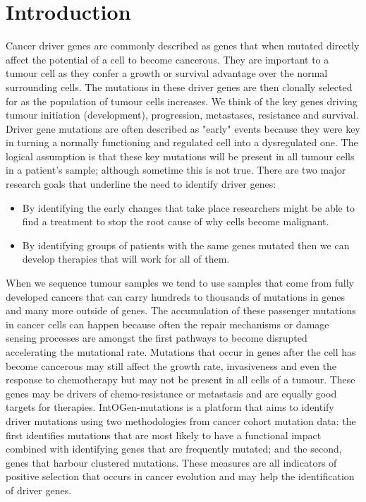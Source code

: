 \section{Introduction}
Cancer driver genes are commonly described as genes that when mutated directly affect
the potential of a cell to become cancerous. They are important to a tumour cell as they
confer a growth or survival advantage over the normal surrounding cells. The mutations
in these driver genes are then clonally selected for as the population of tumour cells
increases. We think of the key genes driving tumour initiation (development), progression,
metastases, resistance and survival. Driver gene mutations are often described as "early"
events because they were key in turning a normally functioning and regulated cell into a
dysregulated one. The logical assumption is that these key mutations will be present in
all tumour cells in a patient's sample; although sometime this is not true.
\vspace{4 mm}
There are two major research goals that underline the need to identify driver genes:
\begin{itemize}
\item By identifying the early changes that take place researchers might be able
to find a treatment to stop the root cause of why cells become malignant. 
\item By identifying groups of patients with the same genes mutated then we can
develop therapies that will work for all of them.
\end{itemize}
\vspace{4 mm}
When we sequence tumour samples we tend to use samples that come from fully developed
cancers that can carry hundreds to thousands of mutations in genes and many more outside
of genes. The accumulation of these passenger mutations in cancer cells can happen
because often the repair mechanisms or damage sensing processes are amongst the first
pathways to become disrupted accelerating the mutational rate. Mutations that occur in
genes after the cell has become cancerous may still affect the growth rate, invasiveness
and even the response to chemotherapy but may not be present in all cells of a tumour.
These genes may be drivers of chemo-resistance or metastasis and are equally good targets
for therapies.
\vspace{4 mm}
IntOGen-mutations is a platform that aims to identify driver mutations using two
methodologies from cancer cohort mutation data: the first identifies mutations that
are most likely to have a functional impact combined with identifying  genes that are
frequently mutated; and the second, genes that harbour clustered mutations. These measures
are all indicators of positive selection that occurs in cancer evolution and may help
the identification of driver genes.


